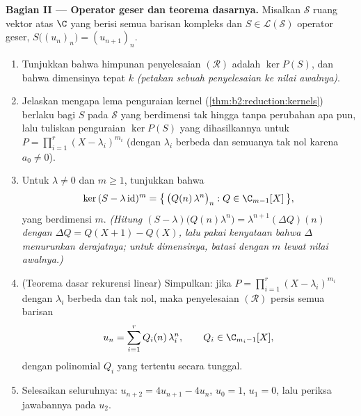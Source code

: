 \begin{problem}
\medskip
\noindent\textbf{Bagian II --- Operator geser dan teorema
dasarnya.} Misalkan $\mathcal{S}$ ruang vektor atas $\C$ yang berisi
semua barisan kompleks dan $S \in
\mathcal{L}(\mathcal{S})$ operator geser, $S\bigl((u_n)_n\bigr) =
(u_{n+1})_n$.
\begin{enumerate}[resume]
  \item Tunjukkan bahwa himpunan penyelesaian $(\mathcal R)$ adalah $\ker
        P(S)$, dan bahwa dimensinya tepat $k$ \emph{(petakan sebuah
        penyelesaian ke nilai awalnya)}.
  \item Jelaskan mengapa lema penguraian kernel
        (\cref{thm:b2:reduction:kernels}) berlaku bagi $S$ pada
        $\mathcal{S}$ yang berdimensi tak hingga tanpa perubahan apa pun,
        lalu tuliskan penguraian $\ker P(S)$ yang dihasilkannya untuk
        $P = \prod_{i=1}^{r}(X - \lambda_i)^{m_i}$ (dengan $\lambda_i$
        berbeda dan semuanya tak nol karena $a_0 \neq 0$).
  \item Untuk $\lambda \neq 0$ dan $m \geq 1$, tunjukkan bahwa
        \[
        \ker\,(S - \lambda\,\mathrm{id})^m
        = \bigl\{\,\bigl(Q(n)\,\lambda^n\bigr)_n : Q \in
        \C_{m-1}[X]\,\bigr\},
        \]
        yang berdimensi $m$. \emph{(Hitung $(S -
        \lambda)\bigl(Q(n)\lambda^n\bigr) =
        \lambda^{n+1}(\Delta Q)(n)$ dengan $\Delta Q = Q(X + 1) -
        Q(X)$, lalu pakai kenyataan bahwa $\Delta$ menurunkan derajatnya;
        untuk dimensinya, batasi dengan $m$ lewat nilai awalnya.)}
  \item (Teorema dasar rekurensi linear) Simpulkan:
        jika $P = \prod_{i=1}^{r}(X - \lambda_i)^{m_i}$ dengan
        $\lambda_i$ berbeda dan tak nol, maka penyelesaian
        $(\mathcal R)$ persis semua barisan
        \[
        u_n = \sum_{i=1}^{r} Q_i(n)\,\lambda_i^n,
        \qquad Q_i \in \C_{m_i - 1}[X],
        \]
        dengan polinomial $Q_i$ yang tertentu secara tunggal.
  \item Selesaikan seluruhnya: $u_{n+2} = 4u_{n+1} - 4u_n$, $u_0 =
        1$, $u_1 = 0$, lalu periksa jawabannya pada $u_2$.
\end{enumerate}


\end{problem}
